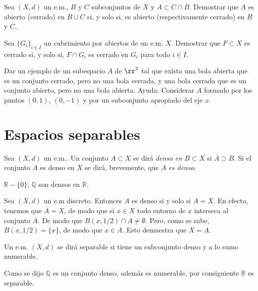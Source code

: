 \begin{ejercicio}{} Sea $(X,d)$ un e.m., $B$ y $C$ subconjuntos de
$X$ y $A\subset C\cap B$. Demostrar que $A$ es abierto (cerrado)
en $B\cup C$ si, y solo si, es abierto (respectivamente cerrado)
en $B$ y $C$.
\end{ejercicio}

\begin{ejercicio}{} Sea $\{G_i\}_{i\in I}$ un cubrimiento por abiertos de un e.m.
$X$. Demostrar que $F\subset X$ es cerrado si, y solo si, $F\cap
G_i$ es cerrado en $G_i$ para todo $i\in I$.
\end{ejercicio}

\begin{ejercicio}{} Dar un ejemplo de un subespacio $A$ de $\rr^2$
tal que exista una bola abierta que es un conjunto cerrado, pero
no una bola cerrada, y una bola cerrada que es un conjunto
abierto, pero no una bola abierta. Ayuda: Considerar $A$ formado
por los puntos $(0,1)$, $(0,-1)$ y por un subconjunto apropiado
del eje $x$.
\end{ejercicio}



\section{Espacios separables}
\begin{definicion}{} Sea $(X,d)$ un e.m.. Un conjunto $A\subset X$
se dirá \emph{denso en }$B\subset X$ si $\overline{A}\supset B$.
Si el conjunto $A$ es denso en $X$ se dirá, brevemente, que $A$
\emph{es denso}.
\end{definicion}
\begin{ejemplo}{} $\mathbb{R}-\{0\}$, $\mathbb{Q}$ son densos en $\mathbb{R}$.
\end{ejemplo}
\begin{ejemplo}{} Sea $(X,d)$ un e.m discreto. Entonces $A$ es denso
si y solo si $A=X$. En efecto, tenemos que $\overline{A}=X$, de
modo que si $x\in X$  todo entorno de $x$ interseca al conjunto
$A$. De modo que  $B(x,1/2)\cap A\neq\emptyset$. Pero, como se
sabe, $B(x,1/2)=\{x\}$, de modo que $x\in A$. Esto demuestra que
$X=A$.
\end{ejemplo}

\begin{definicion}{} Un e.m. $(X,d)$ se dirá separable si tiene un
subconjunto denso y a lo sumo numerable.
\end{definicion}

\begin{ejemplo}{} Como se dijo $\mathbb{Q}$ es un conjunto denso,
además es numerable, por consiguiente $\mathbb{R}$ es separable.
\end{ejemplo}

